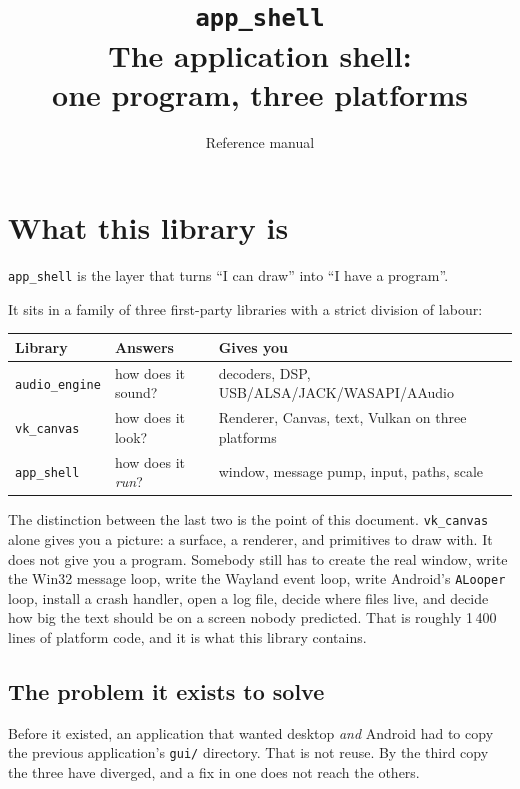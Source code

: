 \documentclass[11pt,a4paper]{article}
\title{\texttt{app\_shell}\\[0.3em]\large The application shell:\\
one program, three platforms}
\author{Reference manual}
\date{}
\begin{document}
\maketitle
\tableofcontents
\newpage

\section{What this library is}

\texttt{app\_shell} is the layer that turns ``I can draw'' into ``I have a
program''.

It sits in a family of three first-party libraries with a strict division of
labour:

\begin{center}
\begin{tabular}{@{}lll@{}}
\toprule
Library & Answers & Gives you \\
\midrule
\texttt{audio\_engine} & how does it sound?   & decoders, DSP, USB/ALSA/JACK/WASAPI/AAudio \\
\texttt{vk\_canvas}    & how does it look?    & Renderer, Canvas, text, Vulkan on three platforms \\
\texttt{app\_shell}    & how does it \emph{run}? & window, message pump, input, paths, scale \\
\bottomrule
\end{tabular}
\end{center}

The distinction between the last two is the point of this document.
\texttt{vk\_canvas} alone gives you a picture: a surface, a renderer, and
primitives to draw with. It does not give you a program. Somebody still has to
create the real window, write the Win32 message loop, write the Wayland event
loop, write Android's \texttt{ALooper} loop, install a crash handler, open a log
file, decide where files live, and decide how big the text should be on a screen
nobody predicted. That is roughly 1\,400 lines of platform code, and it is what
this library contains.

\subsection{The problem it exists to solve}

Before it existed, an application that wanted desktop \emph{and} Android had to
copy the previous application's \texttt{gui/} directory. That is not reuse. By
the third copy the three have diverged, and a fix in one does not reach the
others.
\end{document}

